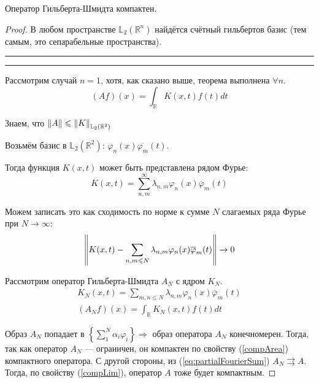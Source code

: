 \documentclass[12pt]{article}
\begin{document}
		\begin{state}
			Оператор Гильберта-Шмидта компактен.
		\end{state}
		\begin{proof}
			В любом пространстве $\mathbb{L}_2(\mathbb{R}^n)$ найдётся счётный гильбертов базис 
			(тем самым, это сепарабельные пространства).
		
			\vspace{2pt}\hrule\vspace{2pt}
		
		
		
			\vspace{2pt}\hrule\vspace{2pt}
		
			Рассмотрим случай $n=1$, хотя, как сказано выше, теорема выполнена $\forall n$. 
			$$(Af)(x) = \int_{\mathbb{R}} K(x,t) f(t) dt$$
		
			Знаем, что $\left\| A \right\| \leqslant \left\| K \right\|_{\mathbb{L}_2(\mathbb{R}^2)}$
		
			Возьмём базис в $\mathbb{L}_2(\mathbb{R}^2)$: $\varphi_n(x)\overline{\varphi_m}(t)$.
		
			Тогда функция $K(x,t)$ может быть представлена рядом Фурье:
			$$K(x,t) = \sum_{n,m}^{\infty}\lambda_{n,m}\varphi_n(x)\overline{\varphi}_m(t)$$
		
			Можем записать это как сходимость по норме к сумме $N$ слагаемых ряда Фурье при $N \rightarrow \infty$:
			\begin{equation} \label{eq:partialFourierSum}
				\left\| K(x,t) - \sum_{n,m\leqslant N}\lambda_{n,m}\varphi_n(x)\overline{\varphi}_m(t) \right\| \rightarrow 0
			\end{equation}
		
			Рассмотрим оператор Гильберта-Шмидта $A_N$ с ядром $K_N$.
			\begin{gather}
				K_N(x,t) = \sum_{m,n \leq N} \lambda_{n,m} \varphi_n(x)\overline{\varphi}_m(t) \\
				(A_Nf)(x) = \int_{\mathbb{R}} K_N(x,t) f(t) dt
			\end{gather}
		
			Образ $A_N$ попадает в $\left\{\sum_1^N \alpha_i \varphi_i \right\} \Rightarrow$ образ оператора $A_N$ 
			конечномерен. Тогда, так как оператор $A_N$ --- ограничен, он компактен по свойству (\ref{compArea}) компактного оператора.
			С другой стороны, из (\ref{eq:partialFourierSum}) $A_N \rightrightarrows A$. Тогда, по свойству (\ref{compLim}), оператор
			$A$ тоже будет компактным.
		\end{proof}
\end{document}
